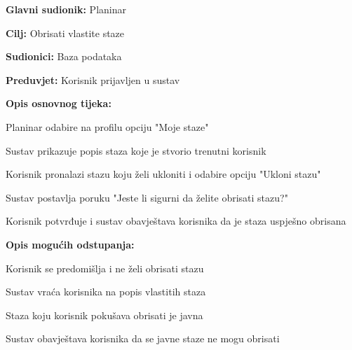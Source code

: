 			\noindent {}
			\begin{packed_item}
				
				\item \textbf{Glavni sudionik: }$ $Planinar$ $
				\item  \textbf{Cilj:} $ $Obrisati vlastite staze$ $
				\item  \textbf{Sudionici:} $ $Baza podataka$ $
				\item  \textbf{Preduvjet:} $ $Korisnik prijavljen u sustav$ $
				\item  \textbf{Opis osnovnog tijeka:}
				
				\item[] \begin{packed_enum}
					
					\item $ $Planinar odabire na profilu opciju "Moje staze"$ $
					\item $ $Sustav prikazuje popis staza koje je stvorio trenutni korisnik$ $
					\item $ $Korisnik pronalazi stazu koju želi ukloniti i odabire opciju "Ukloni stazu"$ $	
					\item $ $Sustav postavlja poruku "Jeste li sigurni da želite obrisati stazu?"$ $
					\item $ $Korisnik potvrđuje i sustav obavještava korisnika da je staza uspješno obrisana $ $
				\end{packed_enum}
				\item  \textbf{Opis mogućih odstupanja:}
				
				\item[] \begin{packed_item}
					
					\item[3.a] $ $Korisnik se predomišlja i ne želi obrisati stazu$ $
					\item[] \begin{packed_enum}
						
						\item $ $Sustav vraća korisnika na popis vlastitih staza$ $
						\end{packed_enum}
					\item[4.a] $ $Staza koju korisnik pokušava obrisati je javna$ $
					\item[] \begin{packed_enum}
						\item $ $Sustav obavještava korisnika da se javne staze ne mogu obrisati$ $
					\end{packed_enum}
				\end{packed_item}
			\end{packed_item}
			
